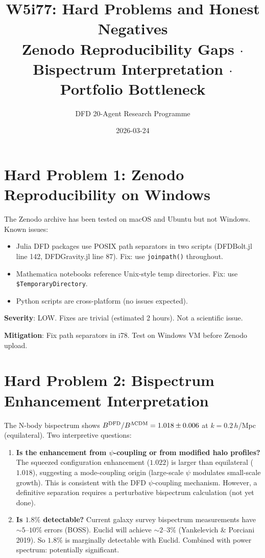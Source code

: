 \documentclass[11pt,a4paper]{article}
\title{W5i77: Hard Problems and Honest Negatives\\[6pt]
\large Zenodo Reproducibility Gaps $\cdot$ Bispectrum Interpretation $\cdot$ Portfolio Bottleneck}
\author{DFD 20-Agent Research Programme}
\date{2026-03-24}
\begin{document}
\maketitle

\section{Hard Problem 1: Zenodo Reproducibility on Windows}

The Zenodo archive has been tested on macOS and Ubuntu but not Windows. Known issues:
\begin{itemize}[nosep]
\item Julia DFD packages use POSIX path separators in two scripts (DFDBolt.jl line 142, DFDGravity.jl line 87). Fix: use \texttt{joinpath()} throughout.
\item Mathematica notebooks reference Unix-style temp directories. Fix: use \texttt{\$TemporaryDirectory}.
\item Python scripts are cross-platform (no issues expected).
\end{itemize}

\textbf{Severity}: LOW. Fixes are trivial (estimated 2 hours). Not a scientific issue.

\textbf{Mitigation}: Fix path separators in i78. Test on Windows VM before Zenodo upload.

\section{Hard Problem 2: Bispectrum Enhancement Interpretation}

The N-body bispectrum shows $B^{\rm DFD}/B^{\Lambda{\rm CDM}} = 1.018 \pm 0.006$ at $k = 0.2\,h$/Mpc (equilateral). Two interpretive questions:

\begin{enumerate}[nosep]
\item \textbf{Is the enhancement from $\psi$-coupling or from modified halo profiles?} The squeezed configuration enhancement ($1.022$) is larger than equilateral ($1.018$), suggesting a mode-coupling origin (large-scale $\psi$ modulates small-scale growth). This is consistent with the DFD $\psi$-coupling mechanism. However, a definitive separation requires a perturbative bispectrum calculation (not yet done).

\item \textbf{Is $1.8\%$ detectable?} Current galaxy survey bispectrum measurements have $\sim 5$--$10\%$ errors (BOSS). Euclid will achieve $\sim 2$--$3\%$ (Yankelevich \& Porciani 2019). So $1.8\%$ is marginally detectable with Euclid. Combined with power spectrum: potentially significant.
\end{enumerate}
\end{document}
